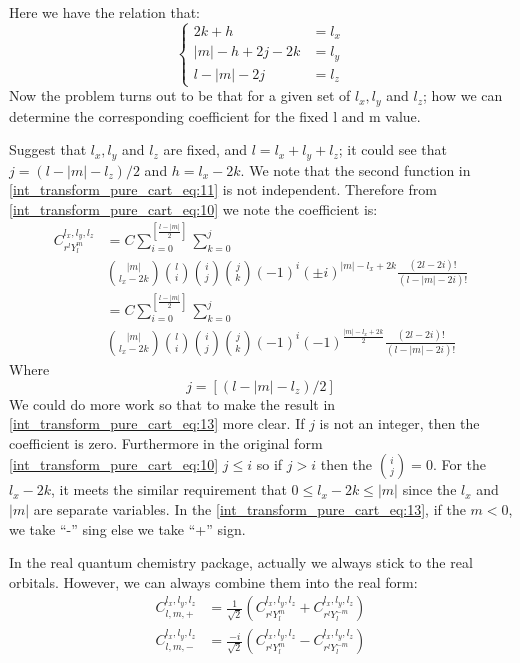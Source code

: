 Here we have the relation that:
\begin{equation}
 \begin{cases}
  2k+h &= l_{x}  \\
  |m|-h+2j-2k &= l_{y} \\
  l-|m|-2j &= l_{z}
 \end{cases}
\label{int_transform_pure_cart_eq:11} 
\end{equation}
Now the problem turns out to be that for a given set of $l_{x}, l_{y}$ and $l_{z}$; 
how we can determine the corresponding coefficient for the fixed l and m value.

Suggest that $l_{x}, l_{y}$ and $l_{z}$ are fixed, and $l = l_{x} + l_{y} + l_{z}$;
it could see that $j = (l-|m| - l_{z})/2$ and $h = l_{x} - 2k$. We note that the second 
function in \ref{int_transform_pure_cart_eq:11} is not independent. Therefore from 
\ref{int_transform_pure_cart_eq:10} we note the coefficient is:
\begin{equation}
 \begin{split}
  C_{r^{l}Y^{m}_{l}}^{l_{x}, l_{y}, l_{z}} &= C\sum_{i=0}^{\left[ \frac{l-|m|}{2}\right] }
\sum_{k=0}^{j} \\
&\binom{|m|}{l_{x}-2k}\binom{l}{i}\binom{i}{j}\binom{j}{k}(-1)^{i}(\pm i)^{|m|-l_{x}+2k}
\frac{(2l-2i)!}{(l-|m|-2i)!} \\
&= C\sum_{i=0}^{\left[ \frac{l-|m|}{2}\right] }
\sum_{k=0}^{j} \\
&\binom{|m|}{l_{x}-2k}\binom{l}{i}\binom{i}{j}\binom{j}{k}(-1)^{i}(-1)^{\frac{|m|-l_{x}+2k}{2}}
\frac{(2l-2i)!}{(l-|m|-2i)!} 
 \end{split}
\label{int_transform_pure_cart_eq:13} 
\end{equation}
Where 
\begin{equation}
 j = \left[ (l-|m| - l_{z})/2\right] 
\end{equation}
We could do more work so that to make the result in \ref{int_transform_pure_cart_eq:13}
more clear. If $j$ is not an integer, then the coefficient is zero. Furthermore 
in the original form  \ref{int_transform_pure_cart_eq:10} $j\leq i$ so if $j > i$ 
then the $\binom{i}{j} = 0$. For the $l_{x}-2k$, it meets the similar requirement that
$0\leq l_{x}-2k \leq |m|$ since the $l_{x}$ and $|m|$ are separate variables. In
the 
\ref{int_transform_pure_cart_eq:13}, if the $m<0$, we take ``-'' sing else we take ``+'' sign. 

In the real quantum chemistry package, actually we always stick to the real orbitals. However, 
we can always combine them into the real form:
\begin{align}
 C_{l,m,+}^{l_{x}, l_{y}, l_{z}} &= \frac{1}{\sqrt{2}}
\left( C_{r^{l}Y^{m}_{l}}^{l_{x}, l_{y}, l_{z}} + C_{r^{l}Y^{-m}_{l}}^{l_{x}, l_{y}, l_{z}}\right) 
\nonumber \\
 C_{l,m,-}^{l_{x}, l_{y}, l_{z}} &= \frac{-i}{\sqrt{2}}
\left( C_{r^{l}Y^{m}_{l}}^{l_{x}, l_{y}, l_{z}} - C_{r^{l}Y^{-m}_{l}}^{l_{x}, l_{y}, l_{z}}\right) 
\label{int_transform_pure_cart_eq:14}
\end{align}

